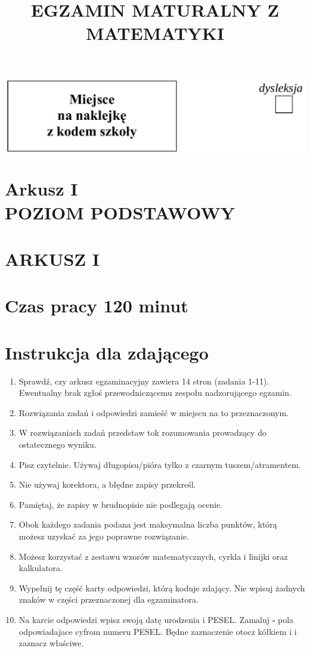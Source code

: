 \documentclass[10pt]{article}
\title{EGZAMIN MATURALNY Z MATEMATYKI }
\author{}
\date{}
\begin{document}
\maketitle
\begin{center}
\includegraphics[max width=\textwidth]{2024_11_21_99a977d92f90f1d0fb7fg-01(1)}
\end{center}

\section*{Arkusz I \\
 POZIOM PODSTAWOWY}
\section*{ARKUSZ I}
\section*{Czas pracy 120 minut}
\section*{Instrukcja dla zdającego}
\begin{enumerate}
  \item Sprawdź, czy arkusz egzaminacyjny zawiera 14 stron (zadania 1-11). Ewentualny brak zgłoś przewodniczącemu zespołu nadzorującego egzamin.
  \item Rozwiązania zadań i odpowiedzi zamieść w miejscu na to przeznaczonym.
  \item W rozwiązaniach zadań przedstaw tok rozumowania prowadzący do ostatecznego wyniku.
  \item Pisz czytelnie. Używaj długopisu/pióra tylko z czarnym tuszem/atramentem.
  \item Nie używaj korektora, a błędne zapisy przekreśl.
  \item Pamiętaj, że zapisy w brudnopisie nie podlegają ocenie.
  \item Obok każdego zadania podana jest maksymalna liczba punktów, którą możesz uzyskać za jego poprawne rozwiązanie.
  \item Możesz korzystać z zestawu wzorów matematycznych, cyrkla i linijki oraz kalkulatora.
  \item Wypełnij tę część karty odpowiedzi, którą koduje zdający. Nie wpisuj żadnych znaków w części przeznaczonej dla egzaminatora.
  \item Na karcie odpowiedzi wpisz swoją datę urodzenia i PESEL. Zamaluj \(\square\) pola odpowiadajace cyfrom numeru PESEL. Będne zaznaczenie otocz kółkiem i i zaznacz właściwe.
\end{enumerate}
\end{document}
